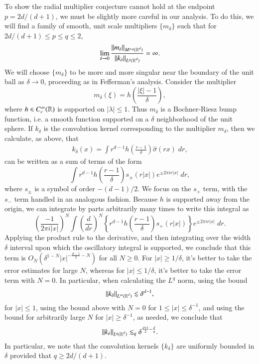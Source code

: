 To show the radial multiplier conjecture cannot hold at the endpoint $p = 2d/(d+1)$, we must be slightly more careful in our analysis. To do this, we will find a family of smooth, unit scale multipliers $\{ m_\delta \}$ such that for $2d/(d+1) \leq p \leq q \leq 2$,
%
\[ \lim_{\delta \to 0} \frac{\| m_\delta \|_{M^{p,q}(\operatorname{\mathbb{R}}^d)}}{\| k_\delta \|_{L^q(\operatorname{\mathbb{R}}^d)}} = \infty. \]
%
We will choose $\{ m_\delta \}$ to be more and more singular near the boundary of the unit ball as $\delta \to 0$, proceeding as in Fefferman's analysis. Consider the multiplier 
%
\[ m_\delta(\xi) = h \left( \frac{|\xi| - 1}{\delta} \right), \]
%
where $h \in C_c^\infty(\operatorname{\mathbb{R}})$ is supported on $|\lambda| \leq 1$. Thus $m_\delta$ is a Bochner-Riesz bump function, i.e. a smooth function supported on a $\delta$ neighborhood of the unit sphere. If $k_\delta$ is the convolution kernel corresponding to the multiplier $m_\delta$, then we calculate, as above, that
%
\begin{align*}
    k_\delta(x) = \int r^{d-1} h \left( \frac{r - 1}{\delta} \right) \widehat{\sigma}(rx)\; dr,
\end{align*}
%
can be written as a sum of terms of the form
%
\[ \int r^{d-1} h \left( \frac{r - 1}{\delta} \right) s_{\pm}(r|x|) e^{\pm 2 \pi i r |x|}\; dr, \]
%
where $s_{\pm}$ is a symbol of order $-(d-1)/2$. We focus on the $s_+$ term, with the $s_-$ term handled in an analogous fashion. Because $h$ is supported away from the origin, we can integrate by parts arbitrarily many times to write this integral as
%
\[ \left( \frac{-1}{2 \pi i |x|} \right)^N \int \left( \frac{d}{dr} \right)^N \left\{ r^{d-1} h \left( \frac{r-1}{\delta} \right) s_+(r|x|) \right\} e^{\pm 2 \pi i r |x|}\; dr. \]
%
Applying the product rule to the derivative, and then integrating over the width $\delta$ interval upon which the oscillatory integral is supported, we conclude that this term is $O_N( \delta^{1 - N} |x|^{- \frac{d-1}{2} -N} )$ for all $N \geq 0$. For $|x| \geq 1/\delta$, it's better to take the error estimates for large $N$, whereas for $|x| \leq 1/\delta$, it's better to take the error term with $N = 0$. In particular, when calculating the $L^q$ norm, using the bound
%
\[ \| k_\delta \|_{L^\infty(\operatorname{\mathbb{R}}^d)} \lesssim \delta^{d-1}, \]
%
for $|x| \leq 1$, using the bound above with $N = 0$ for $1 \leq |x| \leq \delta^{-1}$, and using the bound for arbitrarily large $N$ for $|x| \geq \delta^{-1}$, as needed, we conclude that
%
\[ \| k_\delta \|_{L^q(\operatorname{\mathbb{R}}^d)} \lesssim_q \delta^{\frac{d+1}{2} - \frac{d}{q}}. \]
%
In particular, we note that the convolution kernels $\{ k_\delta \}$ are uniformly bounded in $\delta$ provided that $q \geq 2d/(d+1)$.
